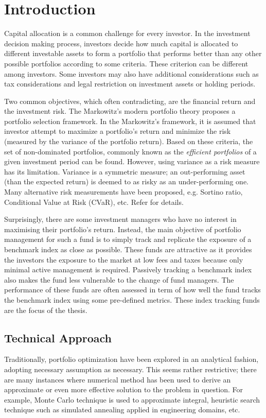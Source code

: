 \chapter{Introduction}
\graphicspath{{Chapter1/figures/}}
\label{Introduction}
Capital allocation is a common challenge for every investor. In the investment decision making process, investors decide how much capital is allocated to different investable assets to form a portfolio that performs better than any other possible portfolios according to some criteria. These criterion can be different among investors. Some investors may also have additional considerations such as tax considerations and legal restriction on investment assets or holding periods.

Two common objectives, which often contradicting, are the financial return and the investment risk. The Markowitz's modern portfolio theory \cite{HM52} proposes a portfolio selection framework. In the Markowitz's framework, it is assumed that investor attempt to maximize a portfolio's return and minimize the risk (measured by the variance of the portfolio return). Based on these criteria, the set of non-dominated portfolios, commonly known as the \emph{efficient portfolios} of a given investment period can be found. However, using variance as a risk measure has its limitation. Variance is a symmetric measure; an out-performing asset (than the expected return) is deemed to as risky as an under-performing one. Many alternative risk measurements have been proposed, e.g. Sortino ratio, Conditional Value at Risk (CVaR), etc. Refer \cite{RTR00} for details.

Surprisingly, there are some investment managers who have no interest in maximising their portfolio's return. Instead, the main objective of portfolio management for such a fund is to simply track and replicate the exposure of a benchmark index as close as possible. These funds are attractive as it provides the investors the exposure to the market at low fees and taxes because only minimal active management is required. Passively tracking a benchmark index also makes the fund less vulnerable to the change of fund managers. The performance of these funds are often assessed in term of how well the fund tracks the benchmark index using some pre-defined metrics. These index tracking funds are the focus of the thesis.

\section{Technical Approach}
Traditionally, portfolio optimization have been explored in an analytical fashion, adopting necessary assumption as necessary. This seems rather restrictive; there are many instances where numerical method has been used to derive an approximate or even more effective solution to the problem in question. For example, Monte Carlo technique is used to approximate integral, heuristic search technique such as simulated annealing applied in engineering domains, etc.

